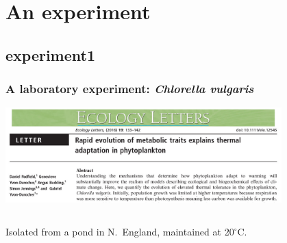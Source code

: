 \documentclass{beamer}
\begin{document}
\section{An experiment}

\subsection{experiment1}
\begin{frame}
  \frametitle{A laboratory experiment: \textit{Chlorella vulgaris}}

  \vspace{-20pt}
  \begin{center}
    \includegraphics[width=0.8\textwidth]{figs/padfield.jpg}
  \end{center}

  \vspace{7pt}

  \begin{columns}
    \begin{column}{0.55\textwidth}
      Isolated from a pond in N.\ England, maintained at 20$^\circ$C.\\[7pt]


\end{column}
\end{columns}
\end{frame}
\end{document}

